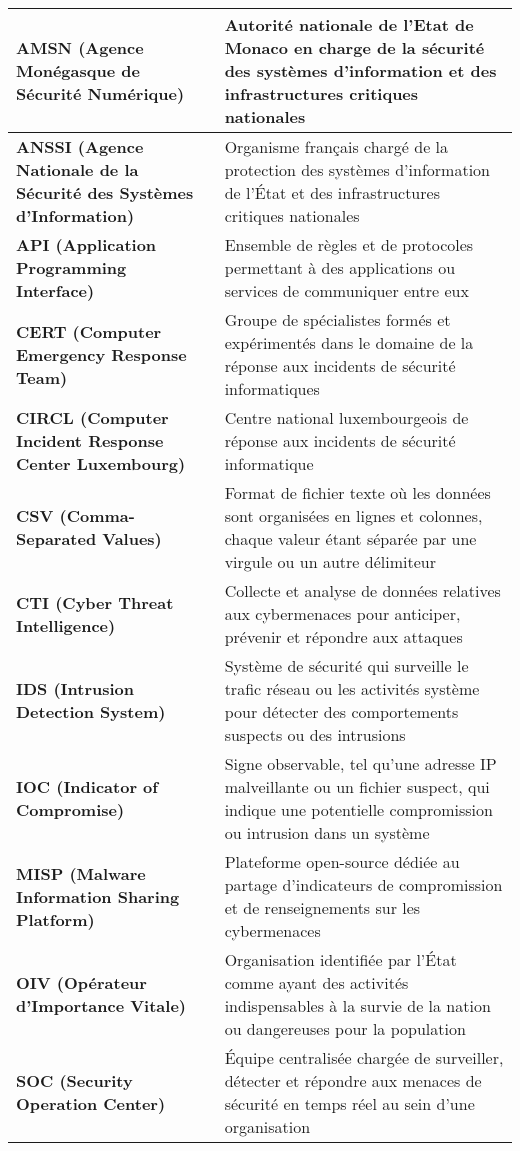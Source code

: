 %
%

\begin{table}[ht!]
    \centering
    \small
    \begin{tabularx}{\textwidth}{|X|X|}
        \hline
        \textbf{AMSN (Agence Monégasque de Sécurité Numérique)} & Autorité nationale de l'Etat de Monaco en charge de la sécurité des systèmes d’information et des infrastructures critiques nationales  \\
        \hline
        \textbf{ANSSI (Agence Nationale de la Sécurité des Systèmes d'Information)} & Organisme français chargé de la protection des systèmes d'information de l'État et des infrastructures critiques nationales \\
        \hline
        \textbf{API (Application Programming Interface)} & Ensemble de règles et de protocoles permettant à des applications ou services de communiquer entre eux \\
        \hline
        \textbf{CERT (Computer Emergency Response Team)} & Groupe de spécialistes formés et expérimentés dans le domaine de la réponse aux incidents de sécurité informatiques \\
        \hline
        \textbf{CIRCL (Computer Incident Response Center Luxembourg)} & Centre national luxembourgeois de réponse aux incidents de sécurité informatique \\
        \hline
        \textbf{CSV (Comma-Separated Values) } & Format de fichier texte où les données sont organisées en lignes et colonnes, chaque valeur étant séparée par une virgule ou un autre délimiteur \\
        \hline
        \textbf{CTI (Cyber Threat Intelligence)} & Collecte et analyse de données relatives aux cybermenaces pour anticiper, prévenir et répondre aux attaques \\
        \hline
        \textbf{IDS (Intrusion Detection System)} & Système de sécurité qui surveille le trafic réseau ou les activités système pour détecter des comportements suspects ou des intrusions \\
        \hline
        \textbf{IOC (Indicator of Compromise)} & Signe observable, tel qu'une adresse IP malveillante ou un fichier suspect, qui indique une potentielle compromission ou intrusion dans un système \\
        \hline
        \textbf{MISP (Malware Information Sharing Platform)} & Plateforme open-source dédiée au partage d'indicateurs de compromission et de renseignements sur les cybermenaces \\
        \hline
        \textbf{OIV (Opérateur d'Importance Vitale)} & Organisation identifiée par l'État comme ayant des activités indispensables à la survie de la nation ou dangereuses pour la population \\
        \hline
        \textbf{SOC (Security Operation Center)} & Équipe centralisée chargée de surveiller, détecter et répondre aux menaces de sécurité en temps réel au sein d'une organisation \\
        \hline
    \end{tabularx}
\end{table}

